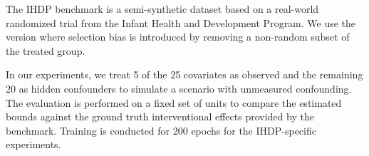 The IHDP benchmark is a semi-synthetic dataset based on a real-world randomized trial from the Infant Health and Development Program. We use the version where selection bias is introduced by removing a non-random subset of the treated group. 

In our experiments, we treat 5 of the 25 covariates as observed and the remaining 20 as hidden confounders to simulate a scenario with unmeasured confounding. The evaluation is performed on a fixed set of units to compare the estimated bounds against the ground truth interventional effects provided by the benchmark. Training is conducted for 200 epochs for the IHDP-specific experiments.
